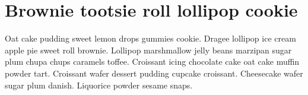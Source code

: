 \appendix

\chapter{Brownie tootsie roll lollipop cookie}
\label{adx:a}

\doublespacing

Oat cake pudding sweet lemon drops gummies cookie. 
Dragee lollipop ice cream apple pie sweet roll brownie. 
Lollipop marshmallow jelly beans marzipan sugar plum chupa chups caramels toffee. 
Croissant icing chocolate cake oat cake muffin powder tart. 
Croissant wafer dessert pudding cupcake croissant. 
Cheesecake wafer sugar plum danish. 
Liquorice powder sesame snaps.
